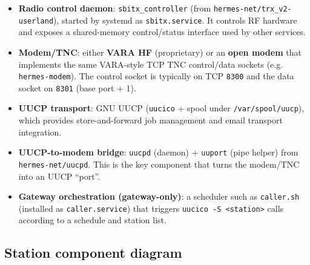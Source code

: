\begin{itemize}
\item \textbf{Radio control daemon}: \verb|sbitx_controller| (from \verb|hermes-net/trx_v2-userland|), started by systemd as
  \verb|sbitx.service|. It controls RF hardware and exposes a shared-memory control/status interface used by other services.
\item \textbf{Modem/TNC}: either \textbf{VARA HF} (proprietary) or an \textbf{open modem} that implements the same VARA-style TCP TNC
  control/data sockets (e.g. \verb|hermes-modem|). The control socket is typically on TCP \verb|8300| and the data socket on
  \verb|8301| (base port + 1).
\item \textbf{UUCP transport}: GNU UUCP (\verb|uucico| + spool under \verb|/var/spool/uucp|), which provides store-and-forward job
  management and email transport integration.
\item \textbf{UUCP-to-modem bridge}: \verb|uucpd| (daemon) + \verb|uuport| (pipe helper) from \verb|hermes-net/uucpd|. This is the key
  component that turns the modem/TNC into an UUCP ``port''.
\item \textbf{Gateway orchestration (gateway-only)}: a scheduler such as \verb|caller.sh| (installed as \verb|caller.service|) that
  triggers \verb|uucico -S <station>| calls according to a schedule and station list.
\end{itemize}

\subsection{Station component diagram}


